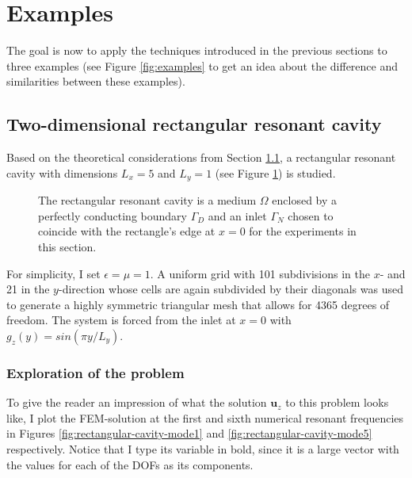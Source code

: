 \documentclass[11pt, a4paper]{article}
\begin{document}
\newpage
\section{Examples}
\label{sec:examples}

The goal is now to apply the techniques introduced in the previous sections
to three examples (see Figure \ref{fig:examples} to get an idea about the
difference and similarities between these examples).

\subsection{Two-dimensional rectangular resonant cavity}
\label{subsec:examples-rectangularcavity}

Based on the theoretical considerations from Section \ref{subsec:examples-rectangularcavity},
a rectangular resonant cavity with dimensions $L_x=5$ and $L_y=1$ (see Figure 
\ref{fig:rectangular_cavity}) is studied.
\begin{figure}[h]
    \centering
    
    \caption{The rectangular resonant cavity is a medium $\Omega$ enclosed
    by a perfectly conducting boundary $\Gamma_D$ and an inlet $\Gamma_N$
    chosen to coincide with the rectangle's edge at $x=0$ for the experiments in this
    section.}
    \label{fig:rectangular_cavity}
\end{figure}

For simplicity, I set $\epsilon=\mu=1$. A uniform grid with 101 subdivisions in
the $x$- and 21 in the $y$-direction whose cells are again subdivided by their
diagonals was used to generate a highly symmetric triangular mesh that allows for 4365 degrees of freedom.
The system is forced from the inlet at $x=0$ with $g_z(y) = sin(\pi y / L_y)$.

\subsubsection{Exploration of the problem}
\label{subsubsec:exploration}

To give the reader an impression of what the solution $\mathbf{u}_z$ to this problem
looks like, I plot the \acrshort{FEM}-solution at the first and sixth numerical resonant
frequencies in Figures \ref{fig:rectangular-cavity-mode1} and \ref{fig:rectangular-cavity-mode5}
respectively. Notice that I type its variable in bold, since it is a large vector with the values
for each of the \acrshort{DOF}s as its components.
\end{document}
